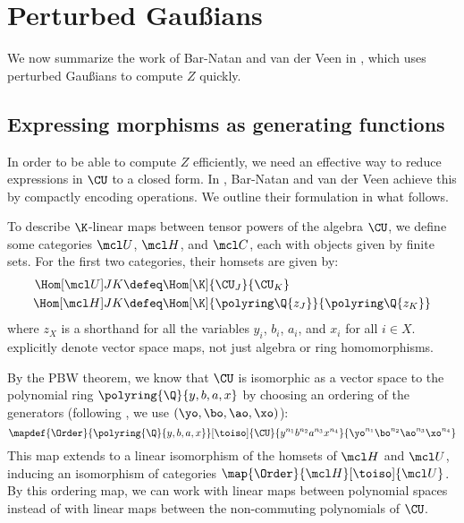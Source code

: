 \chapter{Perturbed Gaußians}\label{ch:perturbed_gaussians}
We now summarize the work of Bar-Natan and van der Veen in \cite{BV}, which uses
perturbed Gaußians to compute $Z$ quickly.

\section{Expressing morphisms as generating functions}

In order to be able to compute $Z$ efficiently, we need an effective way to
reduce expressions in $\CU$ to a closed form. In \cite{BV}, Bar-Natan and van der Veen
achieve this by compactly encoding operations. We outline their formulation
in what follows.

To describe $\K$-linear maps between tensor powers of the algebra $\CU$, we
define some categories $\UMaps$, $\LinMaps$, and $\GenFunc$, each with objects
given by finite sets. For the first two categories, their homsets are given by:
\begin{align}
        \label{eq:hom_umaps}\Hom[\UMaps]JK &\defeq
                \Hom[\K]{\CU_{J}}{\CU_{K}}\\
        \label{eq:hom_linmaps}\Hom[\LinMaps]JK &\defeq
                \Hom[\K]{\polyring\Q{z_J}}{\polyring\Q{z_K}}
\end{align}
where $z_X$ is a shorthand for all the variables $y_i$, $b_i$, $a_i$, and $x_i$
for all $i\in X$.  explicitly denote vector
space maps, not just algebra or ring homomorphisms.

By the PBW theorem, we know that $\CU$ is isomorphic as a vector space to the
polynomial ring $\polyring{\Q}{y, b, a, x}$ by choosing an ordering of the
generators (following \cite{BV}, we use $(\yo, \bo, \ao, \xo)$):
\begin{equation}\label{eq:order_map}
        \mapdef {\Order} {\polyring{\Q}{y, b, a, x}} [\toiso] {\CU}
        {y^{n_1}b^{n_2}a^{n_3}x^{n_4}} {\yo^{n_1}\bo^{n_2}\ao^{n_3}\xo^{n_4}}
\end{equation}
This map extends to a linear isomorphism of the homsets of $\LinMaps$ and
$\UMaps$, inducing an isomorphism of categories
$\map {\Order} {\LinMaps} [\toiso] {\UMaps}$. By this ordering map, we can work
with linear maps between polynomial spaces instead of with linear maps between
the non-commuting polynomials of $\CU$.

